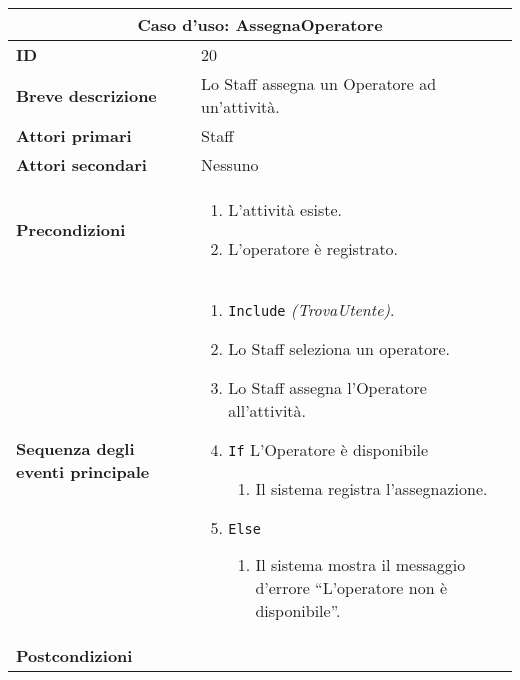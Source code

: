 \documentclass[a4paper]{report}
\begin{document}
\clearpage
\begin{table}[H]
\vspace*{-0cm}
\renewcommand{\arraystretch}{1.9}
\begin{tabular}{|p{3.9cm}|p{9.9cm}|}
\hline
\multicolumn{2}{|c|}{\textbf{Caso d’uso: AssegnaOperatore}} \\ \hline
	\textbf{ID} & 20 \\ \hline
	\textbf{Breve descrizione} & Lo Staff assegna un Operatore ad un’attività. \\ \hline
	\textbf{Attori primari} & Staff \\ \hline
	\textbf{Attori secondari} & Nessuno \\ \hline
	\textbf{Precondizioni} & \begin{enumerate}[leftmargin=14pt,label=\arabic*.,labelsep=0.5em,topsep=0pt,partopsep=0pt,parsep=0pt,itemsep=0pt]
    \item L’attività esiste.
    \item L’operatore è registrato.
\end{enumerate} \\ \hline
	\textbf{Sequenza degli eventi principale} & \begin{enumerate}[leftmargin=14pt,label=\arabic*.,labelsep=0.5em,topsep=0pt,partopsep=0pt,parsep=0pt,itemsep=0pt]
    \item \texttt{Include} \textit{(TrovaUtente)}.
    \item Lo Staff seleziona un operatore.
    \item Lo Staff assegna l’Operatore all’attività.
    \item \texttt{If} L’Operatore è disponibile
    \begin{enumerate}[label=\arabic{enumi}.\arabic*.,leftmargin=22pt,labelsep=0.5em,topsep=0pt,partopsep=0pt,parsep=0pt,itemsep=0pt]
        \item Il sistema registra l’assegnazione.
    \end{enumerate}
    \item \texttt{Else}
    \begin{enumerate}[label=\arabic{enumi}.\arabic*.,leftmargin=22pt,labelsep=0.5em,topsep=0pt,partopsep=0pt,parsep=0pt,itemsep=0pt]
        \item Il sistema mostra il messaggio d’errore “L’operatore non è disponibile”.
    \end{enumerate}
\end{enumerate} \\ \hline
	\textbf{Postcondizioni} & \begin{enumerate}[label=\arabic*.,leftmargin=14pt,labelsep=0.5em,topsep=0pt,partopsep=0pt,parsep=0pt,itemsep=0pt]

\end{enumerate}
\end{tabular}
\end{table}
\end{document}
